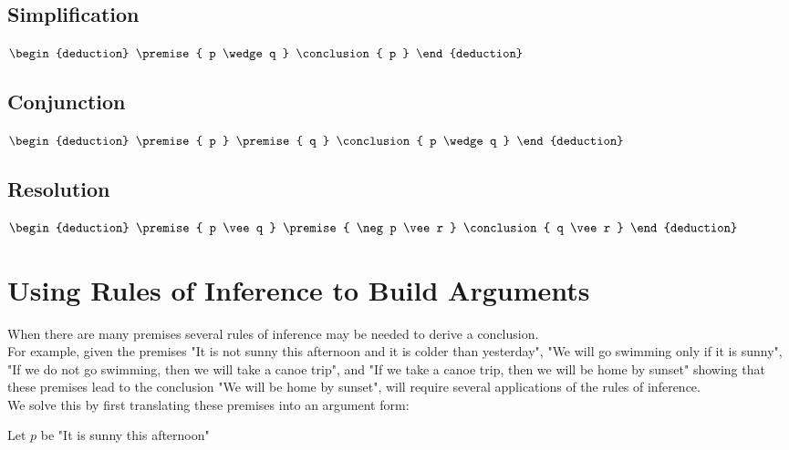 \documentclass[12pt letter]{report}
\begin{document}
\subsection{Simplification}
\begin{math}
	\begin{deduction}
		\premise{ p \wedge q }
		\conclusion{ p }
	\end{deduction}
\end{math}

\subsection{Conjunction}
\begin{math}
	\begin{deduction}
		\premise{ p }
		\premise{ q }
		\conclusion{ p \wedge q }
	\end{deduction}
\end{math}

\subsection{Resolution}
\begin{math}
	\begin{deduction}
		\premise{ p \vee q }
		\premise{ \neg p \vee r }
		\conclusion{ q \vee r }
	\end{deduction}
\end{math}

\section{Using Rules of Inference to Build Arguments}

When there are many premises several rules of inference may be needed to derive a conclusion. \\

For example, given the premises "It is not sunny this afternoon and it is colder than yesterday", "We will go swimming only if it is sunny",
"If we do not go swimming, then we will take a canoe trip", and "If we take a canoe trip, then we will be home by
sunset" showing that these premises lead to the conclusion "We will be home by sunset", will require several
applications of the rules of inference.\\

We solve this by first translating these premises into an argument form:

\noindent Let $p$ be "It is sunny this afternoon"\\
\end{document}
